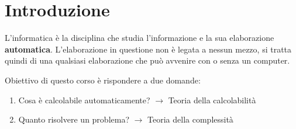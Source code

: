 \section{Introduzione}
L'informatica è la disciplina che studia l'informazione e la sua 
elaborazione \textbf{automatica}. L'elaborazione in questione non
è legata a nessun mezzo, si tratta quindi di una qualsiasi elaborazione
che può avvenire con o senza un computer.

Obiettivo di questo corso è rispondere a due domande:

\begin{enumerate}
    \item Cosa è calcolabile automaticamente? $\rightarrow$
        Teoria della calcolabilità
    \item Quanto  risolvere un problema? $\rightarrow$
        Teoria della complessità
\end{enumerate}